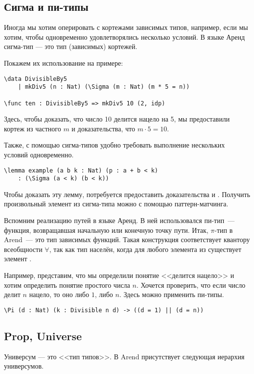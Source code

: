 \subsection{Сигма и пи-типы}
Иногда мы хотим оперировать с кортежами зависимых типов, например, если мы хотим,
чтобы одновременно удовлетворялись несколько условий. В языке Аренд сигма-тип --- это тип (зависимых) кортежей.

Покажем их использование на примере:
\begin{verbatim}
\data DivisibleBy5
    | mkDiv5 (n : Nat) (\Sigma (m : Nat) (m * 5 = n))

\func ten : DivisibleBy5 => mkDiv5 10 (2, idp)
\end{verbatim}

Здесь, чтобы доказать, что число 10 делится нацело на 5, мы предоставили кортеж из частного $m$ и доказательства, что $m \cdot 5 = 10$.

Также, с помощью сигма-типов удобно требовать выполнение нескольких условий одновременно.
\begin{verbatim}
\lemma example (a b k : Nat) (p : a + b < k)
    : (\Sigma (a < k) (b < k))
\end{verbatim}

Чтобы доказать эту лемму, потребуется предоставить доказательства  и .
Получить произвольный элемент из сигма-типа можно с помощью паттерн-матчинга.

\medskip
Вспомним реализацию путей в языке Аренд. В ней использовался пи-тип~--- функция, возвращавшая начальную или конечную точку пути.
Итак, $\pi$-тип в Arend~--- это тип зависимых функций. Такая конструкция соответствует квантору всеобщности $\forall$, так как
тип  населён, когда для любого элемента  из  существует элемент . 

Например, представим, что мы определили понятие <<делится нацело>> и хотим определить понятие простого числа $n$.
Хочется проверить, что если число делит $n$ нацело, то оно либо $1$, либо $n$. Здесь можно применить пи-типы.
\begin{verbatim}
\Pi (d : Nat) (k : Divisible n d) -> ((d = 1) || (d = n))
\end{verbatim}

\subsection{Prop, Universe}

Универсум --- это <<тип типов>>. В Arend присутствует следующая иерархия универсумов.

